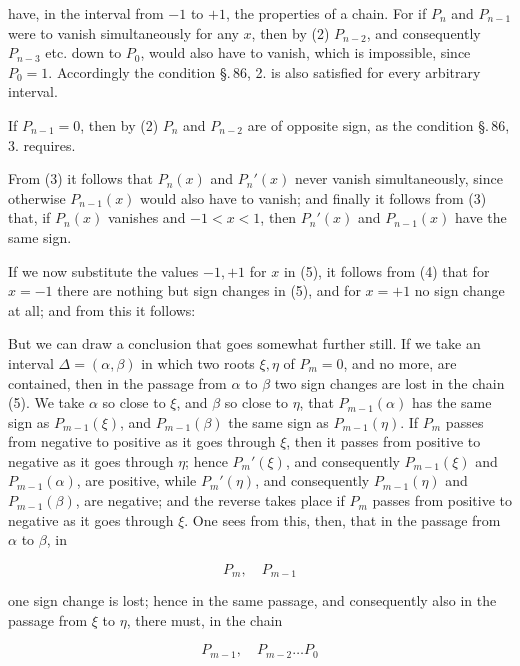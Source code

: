 
have, in the interval from $-1$ to $+1$, the properties of a  chain. For if $P_n$ and $P_{n-1}$ were to vanish simultaneously for any $x$, then by (2) $P_{n-2}$, and consequently $P_{n-3}$ etc. down to $P_0$, would also have to vanish, which is impossible, since $P_0=1$. Accordingly the condition \S.\,86, 2. is also satisfied for every arbitrary interval.

If $P_{n-1}=0$, then by (2) $P_n$ and $P_{n-2}$ are of opposite sign, as the condition \S.\,86, 3. requires.

From (3) it follows that $P_n(x)$ and $P_n'(x)$ never vanish simultaneously, since otherwise $P_{n-1}(x)$ would also have to vanish; and finally it follows from (3) that, if $P_n(x)$ vanishes and $-1<x<1$, then $P_n'(x)$ and $P_{n-1}(x)$ have the same sign.

If we now substitute the values $-1, +1$ for $x$ in (5), it follows from (4) that for $x=-1$ there are nothing but sign changes in (5), and for $x=+1$ no sign change at all; and from this it follows:


But we can draw a conclusion that goes somewhat further still. If we take an interval $\varDelta=(\alpha,\beta)$ in which two roots $\xi, \eta$ of $P_m=0$, and no more, are contained, then in the passage from $\alpha$ to $\beta$ two sign changes are lost in the chain (5). We take $\alpha$ so close to $\xi$, and $\beta$ so close to $\eta$, that $P_{m-1}(\alpha)$ has the same sign as $P_{m-1}(\xi)$, and $P_{m-1}(\beta)$ the same sign as $P_{m-1}(\eta)$. If $P_m$ passes from negative to positive as it goes through $\xi$, then it passes from positive to negative as it goes through $\eta$; hence $P_m'(\xi)$, and consequently $P_{m-1}(\xi)$ and $P_{m-1}(\alpha)$, are positive, while $P_m'(\eta)$, and consequently $P_{m-1}(\eta)$ and $P_{m-1}(\beta)$, are negative; and the reverse takes place if $P_m$ passes from positive to negative as it goes through $\xi$. One sees from this, then, that in the passage from $\alpha$ to $\beta$, in

\[
P_m, \quad P_{m-1}
\]

one sign change is lost; hence in the same passage, and consequently also in the passage from $\xi$ to $\eta$, there must, in the chain

\[
P_{m-1}, \quad P_{m-2} \ldots P_0
\]
